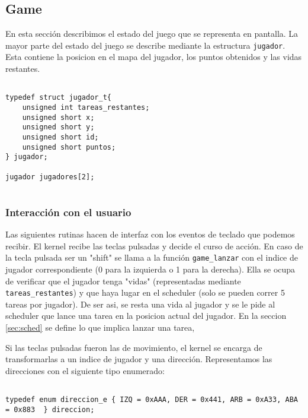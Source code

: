 
\subsection{Game}

\label{sec:game}

En esta sección describimos el estado del juego que se representa en pantalla.
La mayor parte del estado del juego se describe mediante la estructura \verb|jugador|. Esta contiene la posicion en el mapa del jugador, los puntos obtenidos y las vidas restantes.



\begin{verbatim}

typedef struct jugador_t{
    unsigned int tareas_restantes;
    unsigned short x;
    unsigned short y;
    unsigned short id;
    unsigned short puntos;
} jugador;

jugador jugadores[2];


\end{verbatim}


\subsubsection{Interacción con el usuario}


Las siguientes rutinas hacen de interfaz con los eventos de teclado que podemos recibir. El kernel recibe las teclas pulsadas y decide el curso de acción. 
En caso de la tecla pulsada ser un "shift" se llama a la función \verb|game_lanzar| con el indice de jugador correspondiente (0 para la izquierda o 1 para la derecha). Ella se ocupa de verificar que el jugador tenga "vidas" (representadas mediante \verb|tareas_restantes|) y que haya lugar en el scheduler (solo se pueden correr 5 tareas por jugador). De ser asi, se resta una vida al jugador y se le pide al scheduler que lance una tarea en la posicion actual del jugador. En la seccion \ref{sec:sched} se define lo que implica lanzar una tarea,

Si las teclas pulsadas fueron las de movimiento, el kernel se encarga de transformarlas a un indice de jugador y una dirección. Representamos las direcciones con el siguiente tipo enumerado:

\begin{verbatim}

typedef enum direccion_e { IZQ = 0xAAA, DER = 0x441, ARB = 0xA33, ABA = 0x883  } direccion;

\end{verbatim}

